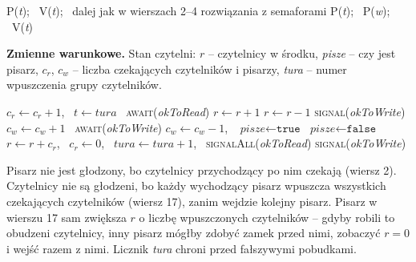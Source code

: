 \documentclass[11pt,a4paper]{article}
\newenvironment{algorytm}[1][htb]
  {\par\bigskip\floatname{algorithm}{}\renewcommand{\thealgorithm}{}
   \begin{algorithm}[#1]%
  }{\end{algorithm}\par\bigskip}
\begin{document}
\begin{algorytm}[H]
\begin{algorithmic}[1]
        \State \textsc{P}(\textit{t}); \ \textsc{V}(\textit{t}); \ dalej jak w wierszach 2--4 rozwiązania z semaforami
    \EndProcedure
        \State \textsc{P}(\textit{t}); \ \textsc{P}(\textit{w}); \ \textsc{V}(\textit{t})
    \EndProcedure
\end{algorithmic}
\caption{Kołowrót (\textsc{endRead} i \textsc{endWrite} bez zmian)}
\end{algorytm}

\textbf{Zmienne warunkowe.} Stan czytelni: $r$ -- czytelnicy w środku, \textit{pisze} -- czy jest pisarz,
$c_r$, $c_w$ -- liczba czekających czytelników i pisarzy, \textit{tura} -- numer wpuszczenia grupy czytelników.

\begin{algorytm}[H]
\begin{algorithmic}[1]
     
            \State $c_r \gets c_r + 1$, \ $t \gets \textit{tura}$
             \ \textsc{await}(\textit{okToRead})
            \EndWhile
            \State \Return {}
        \EndIf
        \State $r \gets r + 1$
    \EndProcedure
        \State $r \gets r - 1$
         \textsc{signal}(\textit{okToWrite})
        \EndIf
    \EndProcedure
        \State $c_w \gets c_w + 1$
         \ \textsc{await}(\textit{okToWrite})
        \EndWhile
        \State $c_w \gets c_w - 1$, \ $\textit{pisze} \gets \texttt{true}$
    \EndProcedure
        \State $\textit{pisze} \gets \texttt{false}$
            \State $r \gets r + c_r$, \ $c_r \gets 0$, \ $\textit{tura} \gets \textit{tura} + 1$, \ \textsc{signalAll}(\textit{okToRead})
        \Else
            \State \textsc{signal}(\textit{okToWrite})
        \EndIf
    \EndProcedure
\end{algorithmic}
\caption{Czytelnicy i pisarze na zmiennych warunkowych}
\end{algorytm}

Pisarz nie jest głodzony, bo czytelnicy przychodzący po nim czekają (wiersz 2). Czytelnicy nie są
głodzeni, bo każdy wychodzący pisarz wpuszcza wszystkich czekających czytelników (wiersz 17),
zanim wejdzie kolejny pisarz. Pisarz w wierszu 17 sam zwiększa $r$ o liczbę wpuszczonych
czytelników -- gdyby robili to obudzeni czytelnicy, inny pisarz mógłby zdobyć zamek przed nimi,
zobaczyć $r = 0$ i wejść razem z nimi. Licznik \textit{tura} chroni przed fałszywymi pobudkami.
\end{document}
